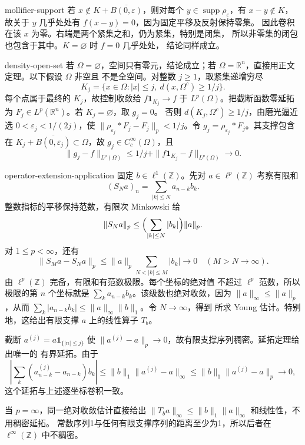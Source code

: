 \begin{solution}{mollifier-support}
若 \(x\notin K+\overline{B(0,\varepsilon)}\)，则对每个
\(y\in\operatorname{supp}\rho_\varepsilon\)，有 \(x-y\notin K\)，
故关于 \(y\) 几乎处处有 \(f(x-y)=0\)，因为固定平移及反射保持零集。
因此卷积在该 \(x\) 为零。右端是两个紧集之和，仍为紧集，特别是闭集，
所以非零集的闭包也包含于其中。\(K=\varnothing\) 时 \(f=0\) 几乎处处，
结论同样成立。
\end{solution}

\begin{solution}{density-open-set}
若 \(\Omega=\varnothing\)，空间只有零元，结论成立；若
\(\Omega=\mathbb R^n\)，直接用正文定理。以下假设 \(\Omega\) 非空且
不是全空间。对整数 \(j\ge1\)，取紧集递增穷尽
\[
 K_j=\{x\in\Omega:|x|\le j,\ d(x,\Omega^c)\ge1/j\}.
\]
每个点属于最终的 \(K_j\)，故控制收敛给
\(f\mathbf1_{K_j}\to f\) 于 \(L^p(\Omega)\)。把截断函数零延拓为
\(F_j\in L^p(\mathbb R^n)\)。若 \(K_j=\varnothing\)，取 \(g_j=0\)。
否则 \(d(K_j,\Omega^c)\ge1/j\)，由磨光逼近选
\(0<\varepsilon_j<1/(2j)\)，使
\(\|\rho_{\varepsilon_j}*F_j-F_j\|_p<1/j\)。令
\(g_j=\rho_{\varepsilon_j}*F_j\)。其支撑包含在
\(K_j+\overline{B(0,\varepsilon_j)}\subset\Omega\)，故
\(g_j\in C_c^\infty(\Omega)\)，且
\[
 \|g_j-f\|_{L^p(\Omega)}
 \le 1/j+\|f\mathbf1_{K_j}-f\|_{L^p(\Omega)}\to0.
\]
\end{solution}

\begin{solution}{operator-extension-application}
固定 \(b\in\ell^1(\mathbb Z)\)。先对 \(a\in\ell^p(\mathbb Z)\)
考察有限和
\[
 (S_Na)_n=\sum_{|k|\le N}a_{n-k}b_k.
\]
整数指标的平移保持范数，有限次 Minkowski 给
\[
 \|S_Na\|_p\le\Bigl(\sum_{|k|\le N}|b_k|\Bigr)\|a\|_p.
\]
对 \(1\le p<\infty\)，还有
\[
 \|S_Ma-S_Na\|_p
 \le\|a\|_p\sum_{N<|k|\le M}|b_k|\longrightarrow0\quad(M>N\to\infty).
\]
由 \(\ell^p(\mathbb Z)\) 完备，有限和有范数极限。每个坐标的绝对值
不超过 \(\ell^p\) 范数，所以极限的第 \(n\) 个坐标就是
\(\sum_k a_{n-k}b_k\)。该级数也绝对收敛，因为
\(\|a\|_\infty\le\|a\|_p\)，从而
\(\sum_k|a_{n-k}b_k|\le\|a\|_\infty\|b\|_1\)。令 \(N\to\infty\)，得到
所求 Young 估计。特别地，这给出有限支撑 \(a\) 上的线性算子 \(T_b\)。

截断 \(a^{(j)}=a\mathbf1_{\{|n|\le j\}}\) 使
\(\|a^{(j)}-a\|_p\to0\)，故有限支撑序列稠密。延拓定理给出唯一的
有界延拓。由于
\[
 \left|\sum_k(a^{(j)}_{n-k}-a_{n-k})b_k\right|
 \le\|b\|_1\|a^{(j)}-a\|_\infty
 \le\|b\|_1\|a^{(j)}-a\|_p\to0,
\]
这个延拓与上述逐坐标卷积一致。

当 \(p=\infty\)，同一绝对收敛估计直接给出
\(\|T_ba\|_\infty\le\|b\|_1\|a\|_\infty\) 和线性性，不用稠密延拓。
常数序列1与任何有限支撑序列的距离至少为1，所以后者在
\(\ell^\infty(\mathbb Z)\) 中不稠密。
\end{solution}
